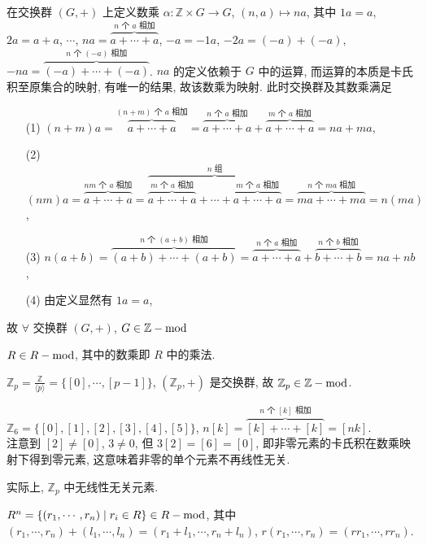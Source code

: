 \documentclass{note}
\begin{document}
\begin{eg}
    在交换群 $(G,+)$ 上定义数乘 $\alpha:\mathbb{Z}\times G\rightarrow G$, $(n,a)\mapsto na$, 其中 $1a=a$, $2a=a+a$, $\cdots$, $na=\overbrace{a+\cdots+a}^{\text{$n$ 个 $a$ 相加}}$, $-a=-1a$, $-2a=(-a)+(-a)$, $-na=\overbrace{(-a)+\cdots+(-a)}^{\text{$n$ 个 $(-a)$ 相加}}$. $na$ 的定义依赖于 $G$ 中的运算, 而运算的本质是卡氏积至原集合的映射, 有唯一的结果, 故该数乘为映射. 此时交换群及其数乘满足
    \begin{itemize}
        \item[(1)] $(n+m)a=\overbrace{a+\cdots+a}^{\text{$(n+m)$ 个 $a$ 相加}}=\overbrace{a+\cdots+a}^{\text{$n$ 个 $a$ 相加}}+\overbrace{a+\cdots+a}^{\text{$m$ 个 $a$ 相加}}=na+ma$,
        \item[(2)] $(nm)a=\overbrace{a+\cdots+a}^{\text{$nm$ 个 $a$ 相加}}=\overbrace{\overbrace{a+\cdots+a}^{\text{$m$ 个 $a$ 相加}}+\cdots+\overbrace{a+\cdots+a}^{\text{$m$ 个 $a$ 相加}}}^{\text{$n$ 组}}=\overbrace{ma+\cdots+ma}^{\text{$n$ 个 $ma$ 相加}}=n(ma)$,
        \item[(3)] $n(a+b)=\overbrace{(a+b)+\cdots+(a+b)}^{\text{$n$ 个 $(a+b)$ 相加}}=\overbrace{a+\cdots+a}^{\text{$n$ 个 $a$ 相加}}+\overbrace{b+\cdots+b}^{\text{$n$ 个 $b$ 相加}}=na+nb$,
        \item[(4)] 由定义显然有 $1a=a$,
    \end{itemize}
    故 $\forall$ 交换群 $(G,+)$, $G\in\mathbb{Z}-\operatorname{mod}$
\end{eg}

\begin{eg}
    $R\in R-\operatorname{mod}$, 其中的数乘即 $R$ 中的乘法.
\end{eg}

\begin{eg}\label{module Zp}
    $\mathbb{Z}_p=\frac{\mathbb{Z}}{\langle p\rangle}=\{[0],\cdots,[p-1]\}$, $(\mathbb{Z}_p,+)$ 是交换群, 故 $\mathbb{Z}_p\in\mathbb{Z}-\operatorname{mod}$.

    $\mathbb{Z}_6=\{[0],[1],[2],[3],[4],[5]\}$, $n[k]=\overbrace{[k]+\cdots+[k]}^{\text{$n$ 个 $[k]$ 相加}}=[nk]$.\\
    注意到 $[2]\neq[0]$, $3\neq 0$, 但 $3[2]=[6]=[0]$, 即非零元素的卡氏积在数乘映射下得到零元素, 这意味着非零的单个元素不再线性无关.

    实际上, $\mathbb{Z}_p$ 中无线性无关元素.
\end{eg}

\begin{eg}
    $R^n=\{(r_1,\cdots,r_n)\mid r_i\in R\}\in R-\operatorname{mod}$, 其中 $(r_1,\cdots,r_n)+(l_1,\cdots,l_n)=(r_1+l_1,\cdots,r_n+l_n)$, $r(r_1,\cdots,r_n)=(rr_1,\cdots,rr_n)$.
\end{eg}
\end{document}
